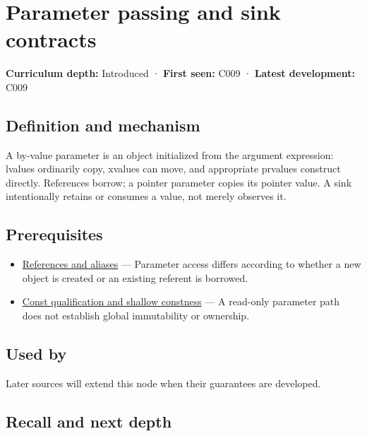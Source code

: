 \hypertarget{appendix-d5908f75721f}{}
\section{Parameter passing and sink contracts}\label{appendix-d5908f75721f-parameter-passing-and-sink-contracts}

\textbf{Curriculum depth:} Introduced · \textbf{First seen:} C009 · \textbf{Latest development:} C009

\subsection{Definition and mechanism}\label{appendix-d5908f75721f-definition-and-mechanism}

A by-value parameter is an object initialized from the argument expression: lvalues ordinarily copy, xvalues can move, and appropriate prvalues construct directly. References borrow; a pointer parameter copies its pointer value. A sink intentionally retains or consumes a value, not merely observes it.

\subsection{Prerequisites}\label{appendix-d5908f75721f-prerequisites}

\begin{itemize}
\tightlist
\item
  \hyperref[appendix-d6d562ca9fbb]{References and aliases} --- Parameter access differs according to whether a new object is created or an existing referent is borrowed.
\item
  \hyperref[appendix-c25d60fed375]{Const qualification and shallow constness} --- A read-only parameter path does not establish global immutability or ownership.
\end{itemize}

\subsection{Used by}\label{appendix-d5908f75721f-used-by}

Later sources will extend this node when their guarantees are developed.

\subsection{Recall and next depth}\label{appendix-d5908f75721f-recall-and-next-depth}

